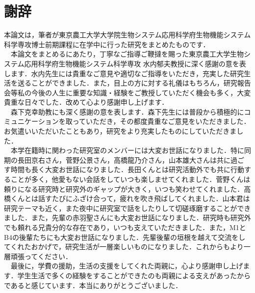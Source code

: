 \chapter*{謝辞}
本論文は，筆者が東京農工大学大学院生物システム応用科学府生物機能システム科学専攻博士前期課程に在学中に行った研究をまとめたものです．\\
　本論文をまとめるにあたり，丁寧なご指導ご鞭撻を賜った東京農工大学生物システム応用科学府生物機能システム科学専攻 水内郁夫教授に深く感謝の意を表します．水内先生には貴重なご意見や適切なご指導をいただき，充実した研究生活を送ることができました．また，目上の方に対する礼儀はもちろん，研究報告会等私の今後の人生に重要な知識・経験をご教授していただく機会も多く，大変貴重な日々でした．改めて心より感謝申し上げます．\\
　森下克幸助教にも深く感謝の意を表します．森下先生には普段から積極的にコミュニケーションを取っていただき，その都度貴重なご意見をいただきました．お気遣いいただいたこともあり，研究をより充実したものにしていただきました．\\
　本学在籍時に関わった研究室のメンバーには大変お世話になりました．特に同期の長田京右さん，菅野公景さん，高橋龍乃介さん，山本雄大さんは共に過ごす時間も長く大変お世話になりました．長田くんとは研究活動外でも共に行動することが多く，他愛もない会話をしていつも楽しませてくれました．菅野くんは頼りになる研究時と研究外のギャップが大きく，いつも笑わせてくれました．高橋くんとは話すたびにふざけ合って，疲れを吹き飛ばしてくれました．山本君は研究テーマも近く，また夜中に研究室で話をしたりして切磋琢磨することができました．また，先輩の赤羽聖さんにも大変お世話になりました．研究時も研究外でも頼れる兄貴分的な存在であり，いつも支えていただきました．また，M1とB4の後輩たちにも大変お世話になりました．先輩後輩の垣根を越えて交流をしてくれたおかげで，研究生活が一層楽しいものになりました．これからもより一層頑張ってください．\\
　最後に，学費の援助，生活の支援をしてくれた両親に，心より感謝申し上げます．学生生活で多くの経験をすることができたのも両親による支えがあったからであると感じています．本当にありがとうございました．
